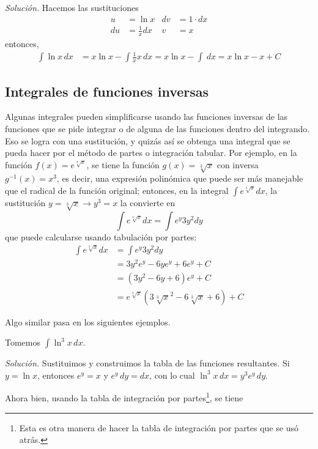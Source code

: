 \emph{Solución.} Hacemos las sustituciones
\begin{align*}
u&=\ln x & dv&=1\cdot dx\\
du&=\frac{1}{x}dx & v&=x
\end{align*}
entonces,
\begin{align*}
\int \ln x\,dx&=x\ln x-\int \frac{1}{x}x\,dx=x\ln x-\int\ dx=x\ln x-x+C
\end{align*}

\subsection{Integrales de funciones inversas}

Algunas integrales pueden simplificarse usando las funciones inversas de las funciones que se pide integrar o de alguna de las funciones dentro del integrando. Eso se logra con una sustitución, y quizás así se obtenga una integral que se pueda hacer por el método de partes o integración tabular. Por ejemplo, en la función $f(x)=e^{\sqrt[3]{x}}$, se tiene la función $g(x)=\sqrt[3]{x}$ con inversa $g^{-1}(x)=x^3$, es decir, una expresión polinómica que puede ser más manejable que el radical de la función original; entonces, en la integral ${\int e^{\sqrt[3]{x}}dx}$, la sustitución $y=\sqrt[3]{x}\rightarrow y^3=x$ la convierte en
\[
\int e^{\sqrt[3]{x}}dx=\int e^{y}3y^{2}dy
\]
que puede calcularse usando tabulación por partes:
\begin{align*}
\int e^{\sqrt[3]{x}}dx&=\int e^{y}3y^{2}dy\\
&=3y^{2}e^{y}-6ye^{y}+6e^{y}+C\\
&=(3y^{2}-6y+6)e^{y}+C\\
&=e^{\sqrt[3]{x}}(3\sqrt[3]{x}^{2}-6\sqrt[3]{x}%
+6)+C
\end{align*}

Algo similar pasa en los siguientes ejemplos.
\begin{ejemplo}
Tomemos $\int \ln ^{3}x\,dx$.
\end{ejemplo}

\emph{Solución.} Sustituimos y construimos la tabla de las funciones resultantes. Si $y=\ln x$, entonces $e^y= x$ y $e^y\,dy= dx$, con lo cual $\ln ^{3}x\,dx=y^3e^y\,dy$.

Ahora bien, usando la tabla de integración por partes\footnote{Esta es otra manera de hacer la tabla de integración por partes que se usó atrás.}, se tiene

\medskip

